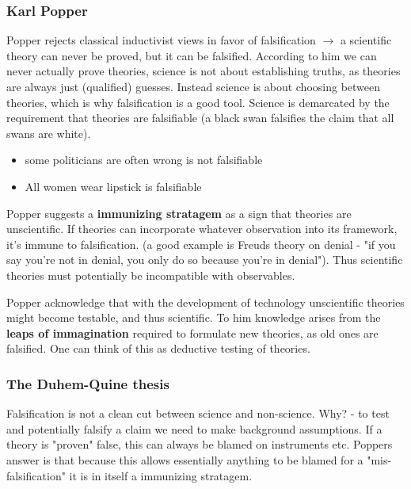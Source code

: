 \documentclass[12pt, a4paper]{article}
\begin{document}
\begin{multicols}{2}
\subsubsection{Karl Popper}
Popper rejects classical inductivist views in favor of falsification $\rightarrow$ a scientific theory can never be proved, but it can be falsified. According to him we can never actually prove theories, science is not about establishing truths, as theories are always just (qualified) guesses. Instead science is about choosing between theories, which is why falsification is a good tool. Science is demarcated by the requirement that theories are falsifiable (a black swan falsifies the claim that all swans are white). 
\begin{itemize}
\item some politicians are often wrong is not falsifiable
\item All women wear lipstick is falsifiable
\end{itemize}
Popper suggests a \textbf{immunizing stratagem} as a sign that theories are unscientific. If theories can incorporate whatever observation into its framework, it's immune to falsification. (a good example is Freuds theory on denial - "if you say you're not in denial, you only do so because you're in denial"). Thus scientific theories must potentially be incompatible with observables.

Popper acknowledge that with the development of technology unscientific theories might become testable, and thus scientific. To him knowledge arises from the \textbf{leaps of immagination} required to formulate new theories, as old ones are falsified. One can think of this as deductive testing of theories. 

\subsubsection{The Duhem-Quine thesis}
Falsification is not a clean cut between science and non-science. Why? - to test and potentially falsify a claim we need to make background assumptions. If a theory is "proven" false, this can always be blamed on instruments etc. Poppers answer is that because this allows essentially anything to be blamed for a "mis-falsification" it is in itself a immunizing stratagem. 


\end{multicols}
\end{document}
